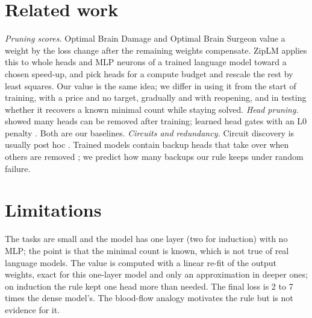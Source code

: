 \documentclass[11pt]{article}
\begin{document}
\section{Related work}

\emph{Pruning scores.} Optimal Brain Damage and Optimal Brain Surgeon \citep{obd,obs} value a weight
by the loss change after the remaining weights compensate. ZipLM \citep{ziplm} applies this to whole
heads and MLP neurons of a trained language model toward a chosen speed-up, and \citet{kwon} pick
heads for a compute budget and rescale the rest by least squares. Our value is the same idea; we
differ in using it from the start of training, with a price and no target, gradually and with
reopening, and in testing whether it recovers a known minimal count while staying solved.
\emph{Head pruning.} \citet{michel} showed many heads can be removed after training; \citet{voita}
learned head gates with an L0 penalty \citep{louizos}. Both are our baselines.
\emph{Circuits and redundancy.} Circuit discovery is usually post hoc \citep{acdc}. Trained models
contain backup heads that take over when others are removed \citep{ioi,hydra}; we predict how many
backups our rule keeps under random failure.

\section{Limitations}

The tasks are small and the model has one layer (two for induction) with no MLP; the point is that
the minimal count is known, which is not true of real language models. The value is computed with
a linear re-fit of the output weights, exact for this one-layer model and only an approximation in
deeper ones; on induction the rule kept one head more than needed. The final loss is 2 to 7 times
the dense model's. The blood-flow analogy motivates the rule but is not evidence for it.
\end{document}
